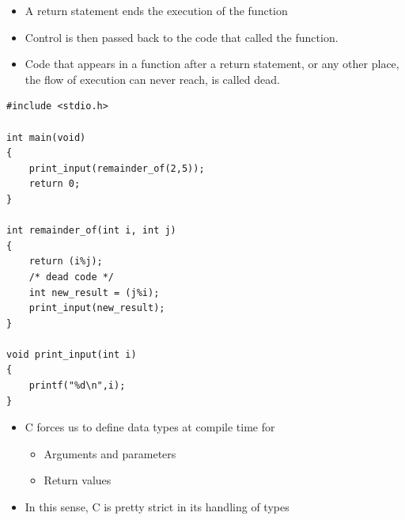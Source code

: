\documentclass{beamer}
\begin{document}
\begin{frame}[fragile]
\begin{itemize}
\item A return statement ends the execution of the function 
\item Control is then passed back to the code that called the function. 
\item Code that appears in a function after a return statement, or any other place, the flow of execution can never reach, is called dead. 
\bigskip
\end{itemize}
\end{frame}

\begin{frame}[fragile]
\begin{block}{}
\begin{lstlisting}
#include <stdio.h>

int main(void) 
{	
    print_input(remainder_of(2,5));
    return 0;
}

int remainder_of(int i, int j)
{
    return (i%j);
    /* dead code */
    int new_result = (j%i);
    print_input(new_result);
}

void print_input(int i)
{
    printf("%d\n",i);
}
\end{lstlisting}
\end{block}
\end{frame}


\begin{frame}
\begin{itemize}
\item C forces us to define data types at compile time for 

\begin{itemize}
\item Arguments and parameters
\item Return values
\end{itemize}
\item In this sense, C is pretty strict in its handling of types
\end{itemize}
\end{frame}
\end{document}
